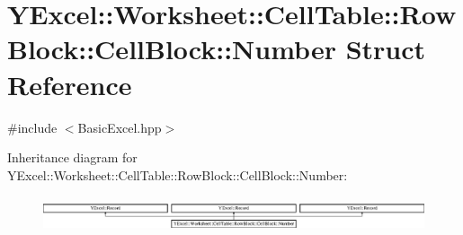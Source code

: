 \hypertarget{struct_y_excel_1_1_worksheet_1_1_cell_table_1_1_row_block_1_1_cell_block_1_1_number}{}\section{Y\+Excel\+:\+:Worksheet\+:\+:Cell\+Table\+:\+:Row\+Block\+:\+:Cell\+Block\+:\+:Number Struct Reference}
\label{struct_y_excel_1_1_worksheet_1_1_cell_table_1_1_row_block_1_1_cell_block_1_1_number}


{\ttfamily \#include $<$Basic\+Excel.\+hpp$>$}

Inheritance diagram for Y\+Excel\+:\+:Worksheet\+:\+:Cell\+Table\+:\+:Row\+Block\+:\+:Cell\+Block\+:\+:Number\+:\begin{figure}[H]
\begin{center}
\leavevmode
\includegraphics[height=1.054614cm]{struct_y_excel_1_1_worksheet_1_1_cell_table_1_1_row_block_1_1_cell_block_1_1_number}
\end{center}
\end{figure}
